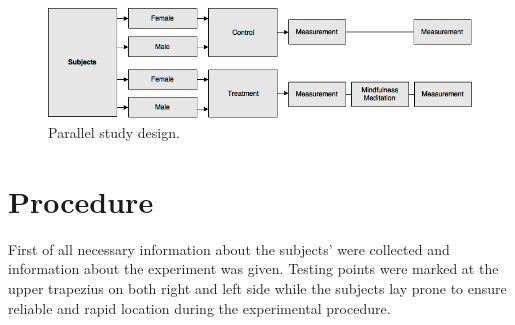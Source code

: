\begin{figure}[H]
	\includegraphics[width=1\textwidth]{figures/studydesign.png} 
	\caption{Parallel study design.}
	\label{fig:studydesign}  
\end{figure}  





\section{Procedure}
First of all necessary information about the subjects’ were collected and information about the experiment was given. Testing points were marked at the upper trapezius on both right and left side while the subjects lay prone to ensure reliable and rapid location during the experimental procedure. 

